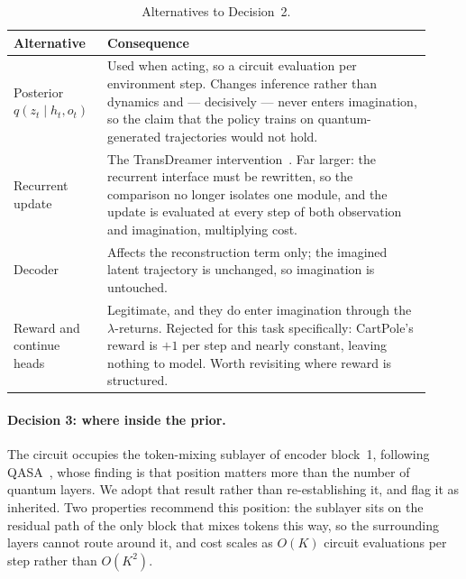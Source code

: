 \documentclass[11pt,onecolumn]{article}
\begin{document}
\begin{table}[htb]\centering\small
\caption{Alternatives to Decision~2.}\label{tab:alt2}
\begin{tabular}{p{0.20\linewidth}p{0.72\linewidth}}
\toprule
Alternative & Consequence \\
\midrule
Posterior $q(z_t \mid h_t, o_t)$ &
Used when acting, so a circuit evaluation per environment step. Changes
inference rather than dynamics and --- decisively --- never enters
imagination, so the claim that the policy trains on quantum-generated
trajectories would not hold. \\[2pt]
Recurrent update &
The TransDreamer intervention~\cite{transdreamer}. Far larger: the
recurrent interface must be rewritten, so the comparison no longer
isolates one module, and the update is evaluated at every step of both
observation and imagination, multiplying cost. \\[2pt]
Decoder &
Affects the reconstruction term only; the imagined latent trajectory is
unchanged, so imagination is untouched. \\[2pt]
Reward and continue heads &
Legitimate, and they do enter imagination through the
$\lambda$-returns. Rejected for this task specifically: CartPole's
reward is $+1$ per step and nearly constant, leaving nothing to model.
Worth revisiting where reward is structured. \\
\bottomrule
\end{tabular}
\end{table}

\paragraph{Decision 3: where inside the prior.}
The circuit occupies the token-mixing sublayer of encoder block~1,
following QASA~\cite{qasa}, whose finding is that position matters more
than the number of quantum layers. We adopt that result rather than
re-establishing it, and flag it as inherited. Two properties recommend
this position: the sublayer sits on the residual path of the only block
that mixes tokens this way, so the surrounding layers cannot route
around it, and cost scales as $O(K)$ circuit evaluations per step rather
than $O(K^2)$.
\end{document}
